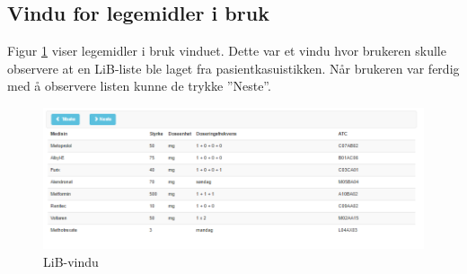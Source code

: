 \subsection{Vindu for legemidler i bruk}
Figur \ref{fig:demo3} viser legemidler i bruk vinduet. Dette var et vindu hvor brukeren skulle observere at en LiB-liste ble laget fra pasientkasuistikken. Når brukeren var ferdig med å observere listen kunne de trykke ''Neste''.
\begin{figure}[H]
\begin{center}
\includegraphics[width=18cm]{images/demoimages/3}
\caption{LiB-vindu}
\label{fig:demo3}
\end{center}
\end{figure}

\newpage
